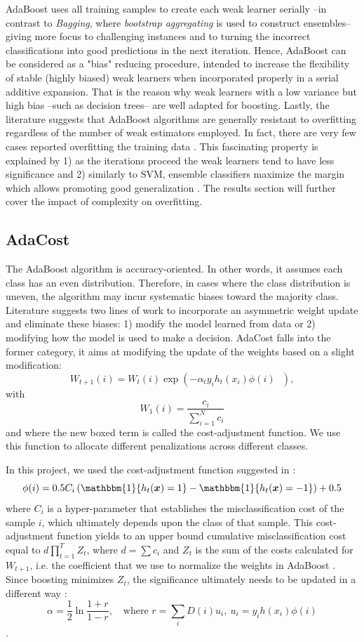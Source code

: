 \documentclass[conference]{IEEEtran}
\begin{document}
AdaBoost uses all training samples to create each weak learner serially --in contrast to \textit{Bagging}, where \textit{bootstrap aggregating} is used to construct ensembles-- giving more focus to challenging instances and to turning the incorrect classifications into good predictions in the next iteration. Hence, AdaBoost can be considered as a "bias" reducing procedure, intended to increase the flexibility of stable (highly biased) weak learners when incorporated properly in a serial additive expansion. That is the reason why weak learners with a low variance but high bias --such as decision trees-- are well adapted for boosting. Lastly, the literature suggests that AdaBoost algorithms are generally resistant to overfitting regardless of the number of weak estimators employed. In fact, there are very few cases reported overfitting the training data \cite{BoostingStats}. This fascinating property is explained by 1) as the iterations proceed the weak learners tend to have less significance and 2) similarly to SVM, ensemble classifiers maximize the margin which allows promoting good generalization \cite{margin_adaboost}. The results section will further cover the impact of complexity on overfitting.

\subsection{AdaCost}
The AdaBoost algorithm is accuracy-oriented. In other words, it assumes each class has an even distribution. Therefore, in cases where the class distribution is uneven, the algorithm may incur systematic biases toward the majority class. Literature suggests two lines of work to incorporate an asymmetric weight update and eliminate these biases: \cite{need_boosting} 1) modify the model learned from data or 2) modifying how the model is used to make a decision. AdaCost falls into the former category, it aims at modifying the update of the weights based on a slight modification:
$$ W_{t+1}(i) = W_t(i) \exp \left(-\alpha_t y_i h_t(x_i) \boxed{\phi(i)} \text{ } \right),$$
with $$ W_1(i) = \frac{c_i}{\sum_{i=1}^Nc_i}$$
and where the new boxed term is called the cost-adjustment function. We use this function to allocate different penalizations across different classes. %

In this project, we used the cost-adjustment function suggested in \cite{ensembles_review}:
$$\phi(i) = 0.5C_i \left( \mathbbm{1}\{ h_t(\boldsymbol x)=1\} -  \mathbbm{1}\{ h_t(\boldsymbol x)=-1\} \right)+0.5$$ where $C_i$ is a hyper-parameter that establishes the misclassification cost of the sample $i$, which ultimately depends upon the class of that sample. This cost-adjustment function yields to an upper bound cumulative misclassification cost equal to $d\prod_{t=1}^TZ_t$, where $d= \sum c_i$ and $Z_t$ is the sum of the costs calculated for $W_{t+1}$, i.e. the coefficient that we use to normalize the weights in AdaBoost \cite{adacost}. Since boosting minimizes $Z_t$, the significance ultimately needs to be updated in a different way \cite{improved_boosting}:
$$ \alpha = \frac{1}{2}\ln\frac{1+r}{1-r},\quad \text{where } r=\sum_iD(i)u_i, \  u_i=y_i h(x_i)\phi(i)$$.
\end{document}
